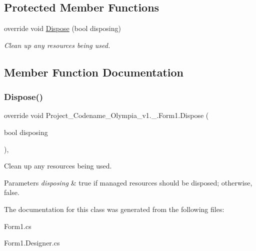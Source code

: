 \subsection*{Protected Member Functions}
\begin{DoxyCompactItemize}
\item 
override void \hyperlink{classProject__Codename__Olympia__v1_1_1__0_1_1Form1_aaa9416dc0391b442a1b3d54968a89123}{Dispose} (bool disposing)
\begin{DoxyCompactList}\small\item\em Clean up any resources being used. \end{DoxyCompactList}\end{DoxyCompactItemize}


\subsection{Member Function Documentation}
\mbox{\label{classProject__Codename__Olympia__v1_1_1__0_1_1Form1_aaa9416dc0391b442a1b3d54968a89123}} 
\subsubsection{\texorpdfstring{Dispose()}{Dispose()}}
{\footnotesize\ttfamily override void Project\+\_\+\+Codename\+\_\+\+Olympia\+\_\+v1.\+\_.\+Form1.\+Dispose (\begin{DoxyParamCaption}\item[{bool}]{disposing }\end{DoxyParamCaption})\hspace{0.3cm}{\ttfamily [inline]}, {\ttfamily [protected]}}



Clean up any resources being used. 


\begin{DoxyParams}{Parameters}
{\em disposing} & true if managed resources should be disposed; otherwise, false.\\
\hline
\end{DoxyParams}


The documentation for this class was generated from the following files\+:\begin{DoxyCompactItemize}
\item 
Form1.\+cs\item 
Form1.\+Designer.\+cs\end{DoxyCompactItemize}
